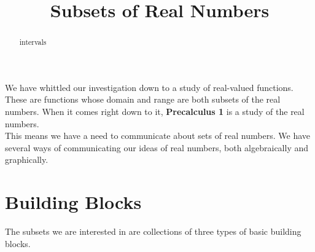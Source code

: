 \documentclass{ximera}
\title{Subsets of Real Numbers}
\begin{document}
\begin{abstract}
intervals
\end{abstract}
\maketitle




We have whittled our investigation down to a study of real-valued functions.  These are functions whose domain and range are both subsets of the real numbers.  When it comes right down to it, \textbf{Precalculus 1} is a study of the real numbers. \\

This means we have a need to communicate about sets of real numbers.  We have several ways of communicating our ideas of real numbers, both algebraically and graphically.


\section{Building Blocks}

The subsets we are interested in are collections of three types of basic building blocks.
\end{document}
